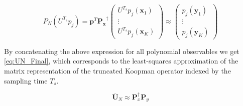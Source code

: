 \documentclass{article}
\begin{document}
        \begin{equation} \label{eq:PN_Min_j}
            P_N \left(U^{T_s} p_j\right) = \mathbf{p}^T \mathbf{P_x}^\dagger
                \begin{pmatrix}
                    U^{T_s} p_j\left(\mathbf{x}_1\right) \\
                    \vdots \\
                    U^{T_s} p_j\left(\mathbf{x}_K\right)
                \end{pmatrix}
            \approx
                \begin{pmatrix}
                    p_j\left(\mathbf{y}_1\right) \\
                    \vdots \\
                    p_j\left(\mathbf{y}_K\right)
                \end{pmatrix}
        \end{equation}

        By concatenating the above expression for all polynomial observables we get \cref{eq:UN_Final}, which corresponds to the least-squares approximation of the matrix representation of the truncated Koopman operator indexed by the sampling time $T_s$.

        \begin{equation} \label{eq:UN_Final}
            \overline{\mathbf{U}}_N \approx \mathbf{P}_x^\dagger \mathbf{P}_y
        \end{equation}

    
\end{document}
